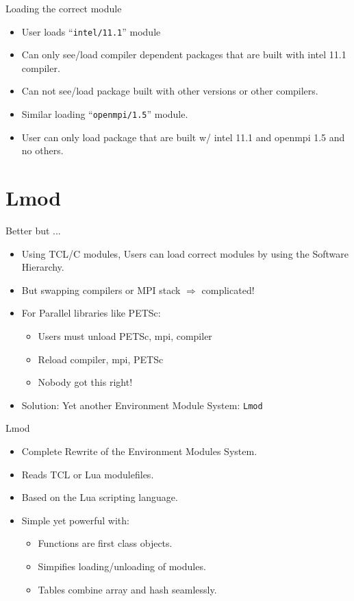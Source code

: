 \documentclass{beamer}
\begin{document}
\begin{frame}{Loading the correct module}
  \begin{itemize}
    \item User loads ``\texttt{intel/11.1}'' module
    \item Can only see/load compiler dependent packages that are built with
      intel 11.1 compiler.
    \item Can not see/load package built with other versions or other compilers.
    \item Similar loading ``\texttt{openmpi/1.5}'' module.
    \item User can only load package that are built w/ intel 11.1 and openmpi 1.5 and no others.
  \end{itemize}
\end{frame}


\section{Lmod}

\begin{frame}{Better but ...}
  \begin{itemize}
    \item Using TCL/C modules, Users can load correct modules by using
      the Software Hierarchy.
    \item But swapping compilers or MPI stack $\Rightarrow$ complicated!
    \item For Parallel libraries like PETSc:
      \begin{itemize}
        \item Users must unload PETSc, mpi, compiler
        \item Reload compiler, mpi, PETSc
        \item Nobody got this right!
      \end{itemize}
    \item Solution: Yet another Environment Module System: \texttt{Lmod}
  \end{itemize}
\end{frame}

\begin{frame}{Lmod}
  \begin{itemize}
    \item Complete Rewrite of the Environment Modules System.
    \item Reads TCL or Lua modulefiles.
    \item Based on the Lua scripting language.
    \item Simple yet powerful with:
      \begin{itemize}
        \item Functions are first class objects.
        \item Simpifies loading/unloading of modules.
        \item Tables combine array and hash seamlessly.
      \end{itemize}
  \end{itemize}
\end{frame}
\end{document}
